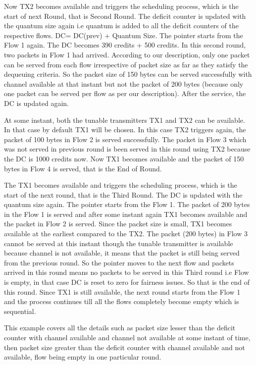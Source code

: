 \documentclass[conference,letterpaper]{IEEEtran}
\begin{document}
Now TX2 becomes available and triggers the scheduling process, which is the
start of next Round, that is Second Round. The deficit counter is updated with
the quantum size again i.e quantum is added to all the deficit counters of the
respective flows. DC= DC(prev) + Quantum Size. The pointer starts from the Flow
1 again. The DC becomes 390 credits + 500 credits. In this second round, two
packets in Flow 1 had arrived. According to our description, only one packet can
be served from each flow irrespective of packet size as far as they satisfy the
dequeuing criteria. So the packet size of 150 bytes can be served successfully
with channel available at that instant but not the packet of 200 bytes (because
only one packet can be served per flow as per our description). After the
service, the DC is updated again.

At some instant, both the tunable transmitters TX1 and TX2 can be available. In
that case by default TX1 will be chosen. In this case TX2 triggers again, the
packet of 100 bytes in Flow 2 is served successfully. The packet in Flow 3 which
was not served in previous round is been served in this round using TX2 because
the DC is 1000 credits now. Now TX1 becomes available and the packet of 150
bytes in Flow 4 is served, that is the End of Round.

The TX1 becomes available and triggers the scheduling process, which is the
start of the next round, that is the Third Round. The DC is updated with the
quantum size again. The pointer starts from the Flow 1. The packet of 200 bytes
in the Flow 1 is served and after some instant again TX1 becomes available and
the packet in Flow 2 is served. Since the packet size is small, TX1 becomes
available at the earliest compared to the TX2. The packet (200 bytes) in Flow 3
cannot be served at this instant though the tunable transmitter is available
because channel is not available, it means that the packet is still being served
from the previous round. So the pointer moves to the next flow and packets
arrived in this round means no packets to be served in this Third round i.e Flow
is empty, in that case DC is reset to zero for fairness issues. So that is the
end of this round. Since TX1 is still available, the next round starts from the
Flow 1 and the process continues till all the flows completely become empty
which is sequential.

This example covers all the details such as packet size lesser than the deficit
counter with channel available and channel not available at some instant of
time, then packet size greater than the deficit counter with channel available
and not available, flow being empty in one particular round.
\end{document}
